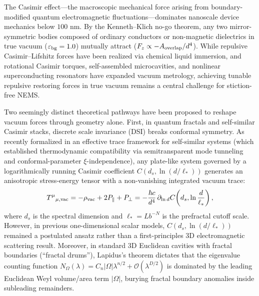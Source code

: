 \documentclass[11pt,letterpaper]{article}
\begin{document}
The Casimir effect---the macroscopic mechanical force arising from boundary-modified quantum electromagnetic fluctuations\cite{casimir1948,bordag2009}---dominates nanoscale device mechanics below $100\text{ nm}$. By the Kenneth--Klich no-go theorem\cite{kennethklich2006}, any two mirror-symmetric bodies composed of ordinary conductors or non-magnetic dielectrics in true vacuum ($\varepsilon_{\rm bg}=1.0$) mutually attract ($F_z \propto -A_{\rm overlap}/d^4$). While repulsive Casimir--Lifshitz forces have been realized via chemical liquid immersion\cite{munday2009}, and rotational Casimir torques\cite{somers2018}, self-assembled microcavities\cite{munkhbat2021}, and nonlinear superconducting resonators\cite{casimir_drum2025,dejong2026} have expanded vacuum metrology, achieving tunable repulsive restoring forces in true vacuum remains a central challenge for stiction-free NEMS.

Two seemingly distinct theoretical pathways have been proposed to reshape vacuum forces through geometry alone. First, in quantum fractals\cite{kempkes2019,xu2021} and self-similar Casimir stacks\cite{akkermans2010,shajesh2016,shajesh2017}, discrete scale invariance (DSI) breaks conformal symmetry. As recently formalized in an effective trace framework for self-similar systems\cite{gordon2026prd} (which established thermodynamic compatibility via semitransparent mode tunneling and conformal-parameter $\xi$-independence\cite{milton2004,milton2016}), any plate-like system governed by a logarithmically running Casimir coefficient $C(d_s, \ln(d/\ell_*))$ generates an anisotropic stress-energy tensor with a non-vanishing integrated vacuum trace\cite{gordon2026prd}:
\begin{equation}
T^\mu{}_{\mu,\rm vac} = -\rho_{\rm vac} + 2P_\parallel + P_\perp = -\frac{\hbar c}{d^4} \,\partial_{\ln d}C\!\left(d_s, \ln\frac{d}{\ell_*}\right),
\label{eq:trace_running}
\end{equation}
where $d_s$ is the spectral dimension and $\ell_* = L b^{-N}$ is the prefractal cutoff scale. However, in previous one-dimensional scalar models\cite{gordon2026prd}, $C(d_s, \ln(d/\ell_*))$ remained a postulated ansatz rather than a first-principles 3D electromagnetic scattering result. Moreover, in standard 3D Euclidean cavities with fractal boundaries (``fractal drums''), Lapidus's theorem\cite{lapidus1991} dictates that the eigenvalue counting function $N_\Omega(\lambda) = C_n |\Omega|\lambda^{n/2} + \mathcal{O}(\lambda^{D/2})$ is dominated by the leading Euclidean Weyl volume/area term $|\Omega|$, burying fractal boundary anomalies inside subleading remainders.
\end{document}

